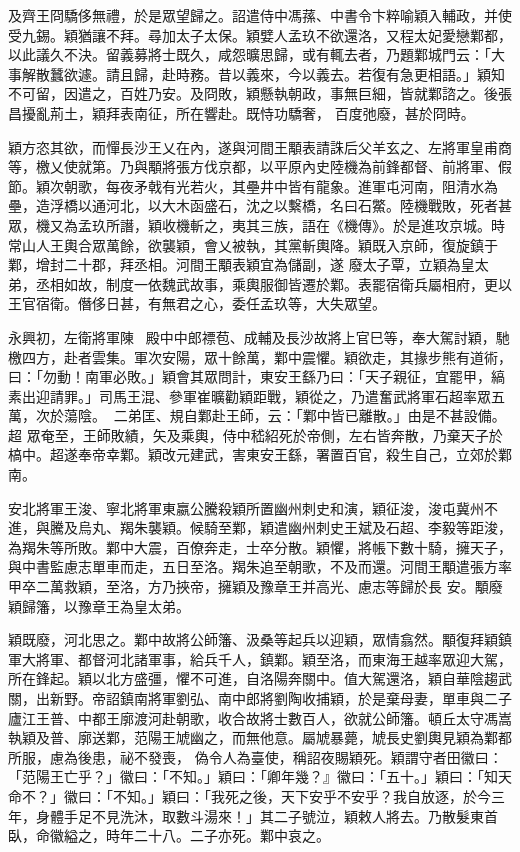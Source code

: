 \begin{pinyinscope}
 及齊王冏驕侈無禮，於是眾望歸之。詔遣侍中馮蓀、中書令卞粹喻穎入輔政，并使受九錫。穎猶讓不拜。尋加太子太保。穎嬖人孟玖不欲還洛，又程太妃愛戀鄴都，以此議久不決。留義募將士既久，咸怨曠思歸，或有輒去者，乃題鄴城門云：「大事解散蠶欲遽。請且歸，赴時務。昔以義來，今以義去。若復有急更相語。」穎知不可留，因遣之，百姓乃安。及冏敗，穎懸執朝政，事無巨細，皆就鄴諮之。後張昌擾亂荊土，穎拜表南征，所在響赴。既恃功驕奢，
 百度弛廢，甚於冏時。



 穎方恣其欲，而憚長沙王乂在內，遂與河間王顒表請誅后父羊玄之、左將軍皇甫商等，檄乂使就第。乃與顒將張方伐京都，以平原內史陸機為前鋒都督、前將軍、假節。穎次朝歌，每夜矛戟有光若火，其壘井中皆有龍象。進軍屯河南，阻清水為壘，造浮橋以通河北，以大木函盛石，沈之以繫橋，名曰石鱉。陸機戰敗，死者甚眾，機又為孟玖所譖，穎收機斬之，夷其三族，語在《機傳》。於是進攻京城。時常山人王輿合眾萬餘，欲襲穎，會乂被執，其黨斬輿降。穎既入京師，復旋鎮于鄴，增封二十郡，拜丞相。河間王顒表穎宜為儲副，遂
 廢太子覃，立穎為皇太弟，丞相如故，制度一依魏武故事，乘輿服御皆遷於鄴。表罷宿衛兵屬相府，更以王官宿衛。僭侈日甚，有無君之心，委任孟玖等，大失眾望。



 永興初，左衛將軍陳，殿中中郎褾苞、成輔及長沙故將上官巳等，奉大駕討穎，馳檄四方，赴者雲集。軍次安陽，眾十餘萬，鄴中震懼。穎欲走，其掾步熊有道術，曰：「勿動！南軍必敗。」穎會其眾問計，東安王繇乃曰：「天子親征，宜罷甲，縞素出迎請罪。」司馬王混、參軍崔曠勸穎距戰，穎從之，乃遣奮武將軍石超率眾五萬，次於蕩陰。二弟匡、規自鄴赴王師，云：「鄴中皆已離散。」由是不甚設備。超
 眾奄至，王師敗績，矢及乘輿，侍中嵇紹死於帝側，左右皆奔散，乃棄天子於槁中。超遂奉帝幸鄴。穎改元建武，害東安王繇，署置百官，殺生自己，立郊於鄴南。



 安北將軍王浚、寧北將軍東嬴公騰殺穎所置幽州刺史和演，穎征浚，浚屯冀州不進，與騰及烏丸、羯朱襲穎。候騎至鄴，穎遣幽州刺史王斌及石超、李毅等距浚，為羯朱等所敗。鄴中大震，百僚奔走，士卒分散。穎懼，將帳下數十騎，擁天子，與中書監慮志單車而走，五日至洛。羯朱追至朝歌，不及而還。河間王顒遣張方率甲卒二萬救穎，至洛，方乃挾帝，擁穎及豫章王并高光、慮志等歸於長
 安。顒廢穎歸籓，以豫章王為皇太弟。



 穎既廢，河北思之。鄴中故將公師籓、汲桑等起兵以迎穎，眾情翕然。顒復拜穎鎮軍大將軍、都督河北諸軍事，給兵千人，鎮鄴。穎至洛，而東海王越率眾迎大駕，所在鋒起。穎以北方盛彊，懼不可進，自洛陽奔關中。值大駕還洛，穎自華陰趨武關，出新野。帝詔鎮南將軍劉弘、南中郎將劉陶收捕穎，於是棄母妻，單車與二子廬江王普、中都王廓渡河赴朝歌，收合故將士數百人，欲就公師籓。頓丘太守馮嵩執穎及普、廓送鄴，范陽王虓幽之，而無他意。屬虓暴薨，虓長史劉輿見穎為鄴都所服，慮為後患，祕不發喪，
 偽令人為臺使，稱詔夜賜穎死。穎謂守者田徽曰：「范陽王亡乎？」徽曰：「不知。」穎曰：「卿年幾？』徽曰：「五十。」穎曰：「知天命不？」徽曰：「不知。」穎曰：「我死之後，天下安乎不安乎？我自放逐，於今三年，身體手足不見洗沐，取數斗湯來！」其二子號泣，穎敕人將去。乃散髮東首臥，命徽縊之，時年二十八。二子亦死。鄴中哀之。




\end{pinyinscope}
